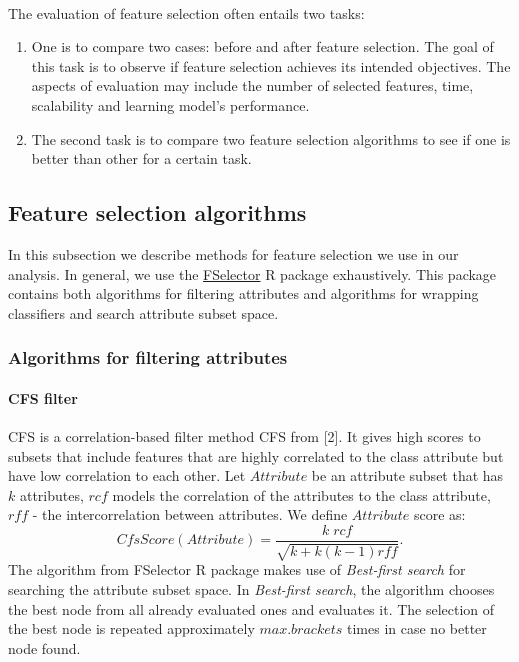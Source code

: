 \documentclass[10pt]{article}\usepackage[]{graphicx}\usepackage[]{color}
\begin{document}
\paragraph{}
The evaluation of feature selection often entails two tasks: 
\begin{enumerate}
\item One is to compare two cases: before and after feature selection. The goal of this task is to observe if feature selection achieves its intended objectives. The aspects of evaluation may include the number of selected features, time, scalability and learning model's performance. 
\item The second task is to compare two feature selection algorithms to see if one is better than other for a certain task. 
\end{enumerate}



\clearpage
\subsection{Feature selection algorithms}
In this subsection we describe methods for feature selection we use in our analysis. In general, we use the \href{http://cran.r-project.org/web/packages/FSelector/index.html}{FSelector} R package exhaustively. This package contains both algorithms for filtering attributes and algorithms for wrapping classifiers and search attribute subset space. 

\subsubsection{Algorithms for filtering attributes}

\paragraph{CFS filter}
CFS is a correlation-based filter method CFS from [2]. It gives high scores to subsets that include features that are highly correlated to the class attribute but have low correlation to each other. Let $Attribute$ be an attribute subset that has $k$ attributes, $rcf$ models the correlation of the attributes to the class attribute, $rff$ - the intercorrelation between attributes. We define $Attribute$ score as:
$$CfsScore(Attribute) =\frac{k\;  rcf}{ \sqrt{k+k(k-1) rff}}.$$
The algorithm from FSelector R package makes use of \textit{Best-first search} for searching the attribute subset space. In \textit{Best-first search}, the algorithm chooses the best node from all already evaluated ones and evaluates it. The selection of the best node is repeated approximately $max.brackets$ times in case no better node found.
\end{document}
